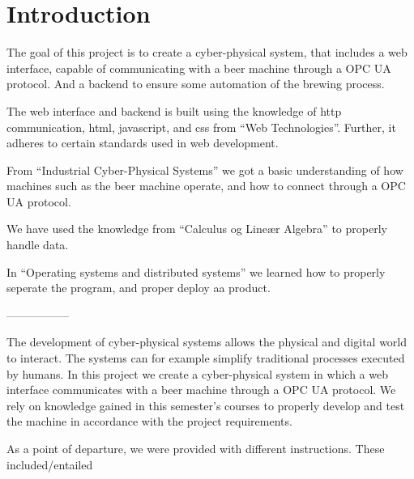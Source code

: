 \section{Introduction}

The goal of this project is to create a cyber-physical system, that includes a web interface, capable of communicating with a beer machine
through a OPC UA protocol. And a backend to ensure some automation of the brewing process.\newline

The web interface and backend is built using the knowledge of http communication, html, javascript, and css from “Web Technologies”.
Further, it adheres to certain standards used in web development. 

From “Industrial Cyber-Physical Systems” we got a basic understanding of how machines such as the beer machine operate, 
and how to connect through a OPC UA protocol.

We have used the knowledge from “Calculus og Lineær Algebra” to properly handle data.

In “Operating systems and distributed systems” we learned how to properly seperate the program, and proper deploy aa product.

-----------------

The development of cyber-physical systems allows the physical and digital world to interact. 
The systems can for example simplify traditional processes executed by humans. 
In this project we create a cyber-physical system in which a web interface communicates with a beer machine through a OPC UA protocol. 
We rely on knowledge gained in this semester's courses to properly develop and test the machine in accordance with the project requirements.

As a point of departure, we were provided with different instructions. These included/entailed
